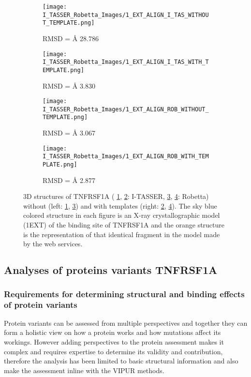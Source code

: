 	\begin{figure}[!ht]
		\centering
		\begin{subfigure}{0.49\textwidth}
			\texttt{[image: I\_TASSER\_Robetta\_Images/1\_EXT\_ALIGN\_I\_TAS\_WITHOUT\_TEMPLATE.png]}
			\caption{RMSD = {\AA} 28.786}
			\label{fig:RES_I_TASSER_Without}
		\end{subfigure}
		\begin{subfigure}{0.49\textwidth}
			\texttt{[image: I\_TASSER\_Robetta\_Images/1\_EXT\_ALIGN\_I\_TAS\_WITH\_TEMPLATE.png]}
			\caption{RMSD = {\AA} 3.830}
			\label{fig:RES_I_TASSER_With}
		\end{subfigure}
		\par\bigskip
		\begin{subfigure}{0.49\textwidth}
			\texttt{[image: I\_TASSER\_Robetta\_Images/1\_EXT\_ALIGN\_ROB\_WITHOUT\_TEMPLATE.png]}
			\caption{RMSD =  {\AA} 3.067}
			\label{fig:RES_Robetta_Without}
		\end{subfigure}
		\begin{subfigure}{0.49\textwidth}
			\texttt{[image: I\_TASSER\_Robetta\_Images/1\_EXT\_ALIGN\_ROB\_WITH\_TEMPLATE.png]}
			\caption{RMSD =  {\AA} 2.877}
			\label{fig:RES_Robetta_With}
		\end{subfigure}
		\caption[I-TASSER and Robetta models with and without templates]{3D structures of TNFRSF1A ( \ref{fig:RES_I_TASSER_Without}, \ref{fig:RES_I_TASSER_With}: I-TASSER, \ref{fig:RES_Robetta_Without}, \ref{fig:RES_Robetta_With}: Robetta) without (left: \ref{fig:RES_I_TASSER_Without}, \ref{fig:RES_Robetta_Without}) and with templates (right: \ref{fig:RES_I_TASSER_With}, \ref{fig:RES_Robetta_With}). The sky blue colored structure in each figure is an X-ray crystallographic model (1EXT) of the binding site of TNFRSF1A and the orange structure is the representation of that identical fragment in the model made by the web services.}
		\label{fig:I_Tasser_Robetta_models}
	\end{figure}
	\label{subsubsec:RES_Expanding_Models}

\newpage
\subsection{Analyses of proteins variants TNFRSF1A}
	\subsubsection{Requirements for determining structural and binding effects of protein variants}
	Protein variants can be assessed from multiple perspectives and together they can form a holistic view on how a protein works and how mutations affect its workings. However adding perspectives to the protein assessment makes it complex and requires expertise to determine its validity and contribution, therefore the analysis has been limited to basic structural information and also make the assessment inline with the VIPUR methods.
	
